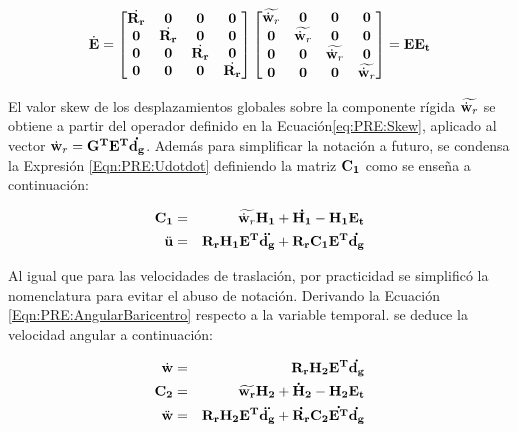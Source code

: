 \begin{equation}
\dot{\bf{E}}=\begin{bmatrix}
	\dot{\bf{R}_r} & \bf{0} & \bf{0} & \bf{0} \\ 
	\bf{0}&\dot{\bf{R}_r}  & \bf{0} & \bf{0}\\ 
	\bf{0}& \bf{0} & \dot{\bf{R}_r} & \bf{0}\\ 
	\bf{0}& \bf{0} & \bf{0} & \dot{\bf{R}_r}
\end{bmatrix}\begin{bmatrix}
	\widetilde{\dot{\bf{w}}_r} & \bf{0} & \bf{0} & \bf{0} \\ 
	\bf{0}& \widetilde{\dot{\bf{w}}_r}  & \bf{0} & \bf{0}\\ 
	\bf{0}& \bf{0} & \widetilde{\dot{\bf{w}}_r} & \bf{0}\\ 
	\bf{0}& \bf{0} & \bf{0} & \widetilde{\dot{\bf{w}}_r}
\end{bmatrix}=\bf{E}\bf{E}_t
\end{equation}

El valor skew de los desplazamientos globales sobre la componente rígida $\widetilde{\dot{\bf{w}}_r}$ se obtiene a partir del operador definido en la Ecuación\eqref{eq:PRE:Skew}, aplicado al vector $\dot{\bf{w}}_r=\bf{G}^T\bf{E}^T\dot{\bf{d}_g}$. Además para simplificar la notación a futuro, se condensa la Expresión \eqref{Eqn:PRE:Udotdot} definiendo la matriz $\bf{C}_1$ como se enseña a continuación:

\begin{eqnarray}
	\label{Eqn:PRE:DefC1}
    \bf{C}_1 &=& \widetilde{\dot{\bf{w}}_r}\bf{H_1}+\dot{\bf{H}_1}-\bf{H}_1\bf{E}_t\\
    \label{Eqn:PRE:UdotdotC1}
    \ddot{\bf{u}} &=&\bf{R}_r\bf{H}_1\bf{E}^T\ddot{{d}_g}+\bf{R}_r\bf{C}_1\bf{E}^T\dot{{d}_g}
\end{eqnarray}

Al igual que para las velocidades de traslación, por practicidad se simplificó la nomenclatura para evitar el abuso de notación. Derivando la Ecuación \eqref{Eqn:PRE:AngularBaricentro} respecto a la variable temporal. se deduce la velocidad angular a continuación: 

\begin{eqnarray}
	\label{Eqn:PRE:VelAngular}
	\dot{\bf{w}}&=&\bf{R}_r\bf{H}_2\bf{E}^T\dot{{\bf{d_g}}}\\
	\label{Eqn:PRE:DefC}
	\bf{C}_2&=&\widetilde{\bf{w}_r}\bf{H}_2+\bf{\dot{H}_2}-\bf{H}_2\bf{E}_t\\
	\label{Eqn:PRE:AcelAngular}
	\ddot{\bf{w}}&=&\bf{R}_r\bf{H}_2\bf{E}^T\ddot{{\bf{d_g}}}+ \dot{\bf{R}_r} \bf{C}_2 \dot{\bf{E}^T} \dot{ \bf{d}_g }	
\end{eqnarray}

